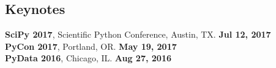 \documentclass[margin,line]{resume}
\begin{document}
\begin{resume}
    \section{\mysidestyle Keynotes}
      \textbf{SciPy 2017}, Scientific Python Conference, Austin, TX.  \hfill\textbf{Jul 12, 2017}\\
      \textbf{PyCon 2017}, Portland, OR.  \hfill\textbf{May 19, 2017}\\
      \textbf{PyData 2016}, Chicago, IL.  \hfill\textbf{Aug 27, 2016}\\

\end{resume}
\end{document}
